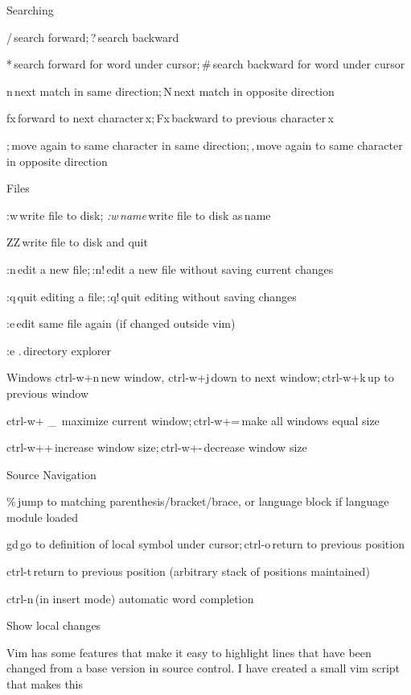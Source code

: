 Searching 

/ search forward; ? search backward 

* search forward for word under cursor; \# search backward for word under cursor 

n next match in same direction; N next match in opposite direction 

fx forward to next character x; Fx backward to previous character x 

; move again to same character in same direction; , move again to same character in opposite direction 

Files 

:w write file to disk; \textit{:w name} write file to disk as name 

ZZ write file to disk and quit 

:n edit a new file; :n! edit a new file without saving current changes 

:q quit editing a file; :q! quit editing without saving changes 

:e edit same file again (if changed outside vim) 

:e . directory explorer 

Windows 
ctrl-w+n new window, ctrl-w+j down to next window; ctrl-w+k up to previous window 

ctrl-w+ _  maximize current window; ctrl-w+= make all windows equal size 

ctrl-w++ increase window size; ctrl-w+- decrease window size 

Source Navigation 

\% jump to matching parenthesis/bracket/brace, or language block if language module loaded 

gd go to definition of local symbol under cursor; ctrl-o return to previous position 

ctrl-t return to previous position (arbitrary stack of positions maintained) 

ctrl-n (in insert mode) automatic word completion 

Show local changes 

Vim has some features that make it easy to highlight lines that have been changed from a base version in source control. I have created a small vim script that makes this

